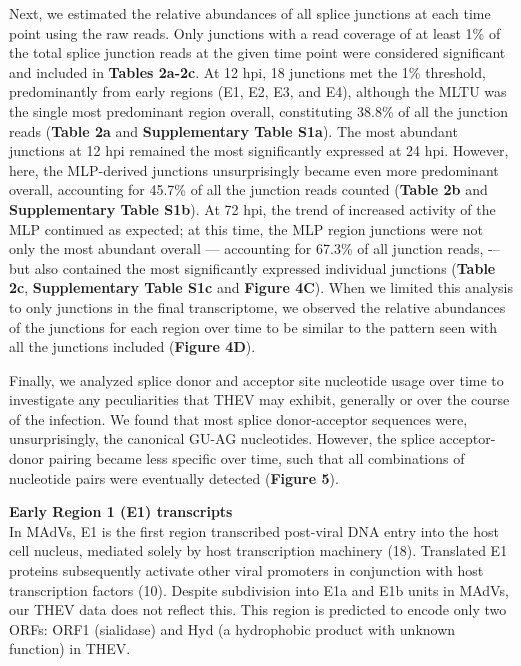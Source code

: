 \documentclass[
]{article}
\begin{document}
Next, we estimated the relative abundances of all splice junctions at
each time point using the raw reads. Only junctions with a read coverage
of at least 1\% of the total splice junction reads at the given time
point were considered significant and included in \textbf{Tables 2a-2c}.
At 12 hpi, 18 junctions met the 1\% threshold, predominantly from early
regions (E1, E2, E3, and E4), although the MLTU was the single most
predominant region overall, constituting 38.8\% of all the junction
reads (\textbf{Table 2a} and \textbf{Supplementary Table S1a}). The most
abundant junctions at 12 hpi remained the most significantly expressed
at 24 hpi. However, here, the MLP-derived junctions unsurprisingly
became even more predominant overall, accounting for 45.7\% of all the
junction reads counted (\textbf{Table 2b} and \textbf{Supplementary
Table S1b}). At 72 hpi, the trend of increased activity of the MLP
continued as expected; at this time, the MLP region junctions were not
only the most abundant overall --- accounting for 67.3\% of all junction
reads, -\/-- but also contained the most significantly expressed
individual junctions (\textbf{Table 2c}, \textbf{Supplementary Table
S1c} and \textbf{Figure 4C}). When we limited this analysis to only
junctions in the final transcriptome, we observed the relative
abundances of the junctions for each region over time to be similar to
the pattern seen with all the junctions included (\textbf{Figure 4D}).

Finally, we analyzed splice donor and acceptor site nucleotide usage
over time to investigate any peculiarities that THEV may exhibit,
generally or over the course of the infection. We found that most splice
donor-acceptor sequences were, unsurprisingly, the canonical GU-AG
nucleotides. However, the splice acceptor-donor pairing became less
specific over time, such that all combinations of nucleotide pairs were
eventually detected (\textbf{Figure 5}).

\textbf{Early Region 1 (E1) transcripts}\\
In MAdVs, E1 is the first region transcribed post-viral DNA entry into
the host cell nucleus, mediated solely by host transcription machinery
(18). Translated E1 proteins subsequently activate other viral promoters
in conjunction with host transcription factors (10). Despite subdivision
into E1a and E1b units in MAdVs, our THEV data does not reflect this.
This region is predicted to encode only two ORFs: ORF1 (sialidase) and
Hyd (a hydrophobic product with unknown function) in THEV.
\end{document}
